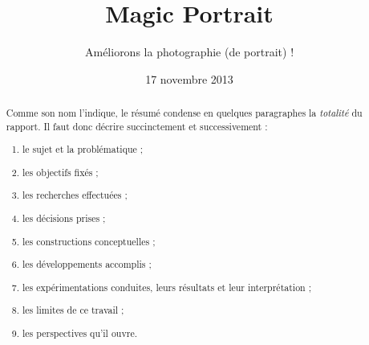 \documentclass[11pt, french]{report-rd-info}
\begin{document}
\title{Magic Portrait}
\subtitle{Améliorons la photographie (de portrait) !}
\date{17 novembre 2013}


\begin{abstract}
Comme son nom l'indique, le résumé condense en quelques paragraphes
la \emph{totalité} du rapport. Il faut donc décrire succinctement et
successivement :
\begin{enumerate}
   \item le sujet et la problématique ;
   \item les objectifs fixés ;
   \item les recherches effectuées ;
   \item les décisions prises ;
   \item les constructions conceptuelles ;
   \item les développements accomplis ;
   \item les expérimentations conduites, leurs résultats et leur interprétation ;
   \item les limites de ce travail ;
   \item les perspectives qu'il ouvre.
\end{enumerate}
\end{abstract}
\end{document}
